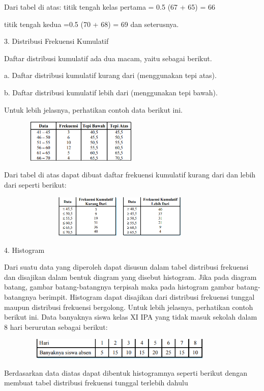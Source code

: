 \documentclass[11pt,fleqn]{book} %
\begin{document}
{Dari tabel di atas: titik tengah kelas pertama = 0.5 (67 + 65) = 66

titik tengah kedua =0.5 (70 + 68) = 69
 dan seterusnya.
 
 
3. Distribusi Frekuensi Kumulatif


Daftar distribusi kumulatif ada dua macam, yaitu sebagai berikut.

a. Daftar distribusi kumulatif kurang dari (menggunakan tepi atas).

b. Daftar distribusi kumulatif lebih dari (menggunakan tepi bawah).

Untuk lebih jelasnya, perhatikan contoh data berikut ini.

\includegraphics[width = 8cm, height= 2cm]{Pictures/5reska.png}

Dari tabel di atas dapat dibuat daftar frekuensi kumulatif kurang dari dan lebih
dari seperti berikut: 




\includegraphics[width = 12cm, height= 2cm]{Pictures/6reska.png}



4. Histogram


Dari suatu data yang diperoleh dapat disusun dalam tabel distribusi frekuensi dan
disajikan dalam bentuk diagram yang disebut histogram. Jika pada diagram batang,
gambar batang-batangnya terpisah maka pada histogram gambar batang-batangnya berimpit. Histogram dapat disajikan dari distribusi frekuensi tunggal maupun distribusi
frekuensi bergolong. Untuk lebih jelasnya, perhatikan contoh berikut ini.
Data banyaknya siswa kelas XI IPA yang tidak masuk sekolah dalam 8 hari berurutan
sebagai berikut: 

\includegraphics[width = 12cm, height= 1cm]{Pictures/7reska.png}

Berdasarkan data diatas dapat dibentuk histogramnya seperti berikut dengan membuat
tabel distribusi frekuensi tunggal terlebih dahulu

}
\end{document}
